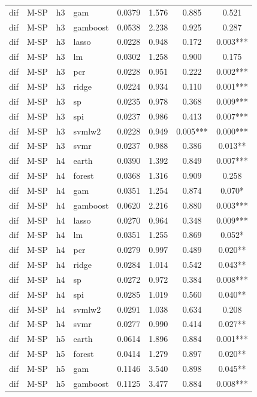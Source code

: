 \begin{ThreePartTable}
\begin{longtable}[t]{llclcccc}
dif & M-SP & h3 & gam & 0.0379 & 1.576 & 0.885 & 0.521\\
dif & M-SP & h3 & gamboost & 0.0538 & 2.238 & 0.925 & 0.287\\
dif & M-SP & h3 & lasso & 0.0228 & 0.948 & 0.172 & 0.003***\\
dif & M-SP & h3 & lm & 0.0302 & 1.258 & 0.900 & 0.175\\
dif & M-SP & h3 & pcr & 0.0228 & 0.951 & 0.222 & 0.002***\\
dif & M-SP & h3 & ridge & 0.0224 & 0.934 & 0.110 & 0.001***\\
dif & M-SP & h3 & sp & 0.0235 & 0.978 & 0.368 & 0.009***\\
dif & M-SP & h3 & spi & 0.0237 & 0.986 & 0.413 & 0.007***\\
dif & M-SP & h3 & svmlw2 & 0.0228 & 0.949 & 0.005*** & 0.000***\\
dif & M-SP & h3 & svmr & 0.0237 & 0.988 & 0.386 & 0.013**\\
\addlinespace
dif & M-SP & h4 & earth & 0.0390 & 1.392 & 0.849 & 0.007***\\
dif & M-SP & h4 & forest & 0.0368 & 1.316 & 0.909 & 0.258\\
dif & M-SP & h4 & gam & 0.0351 & 1.254 & 0.874 & 0.070*\\
dif & M-SP & h4 & gamboost & 0.0620 & 2.216 & 0.880 & 0.003***\\
dif & M-SP & h4 & lasso & 0.0270 & 0.964 & 0.348 & 0.009***\\
dif & M-SP & h4 & lm & 0.0351 & 1.255 & 0.869 & 0.052*\\
dif & M-SP & h4 & pcr & 0.0279 & 0.997 & 0.489 & 0.020**\\
dif & M-SP & h4 & ridge & 0.0284 & 1.014 & 0.542 & 0.043**\\
dif & M-SP & h4 & sp & 0.0272 & 0.972 & 0.384 & 0.008***\\
dif & M-SP & h4 & spi & 0.0285 & 1.019 & 0.560 & 0.040**\\
dif & M-SP & h4 & svmlw2 & 0.0291 & 1.038 & 0.634 & 0.208\\
dif & M-SP & h4 & svmr & 0.0277 & 0.990 & 0.414 & 0.027**\\
\addlinespace
dif & M-SP & h5 & earth & 0.0614 & 1.896 & 0.884 & 0.001***\\
dif & M-SP & h5 & forest & 0.0414 & 1.279 & 0.897 & 0.020**\\
dif & M-SP & h5 & gam & 0.1146 & 3.540 & 0.898 & 0.045**\\
dif & M-SP & h5 & gamboost & 0.1125 & 3.477 & 0.884 & 0.008***\\

\end{longtable}
\end{ThreePartTable}
